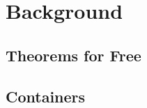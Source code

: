 
\section{Background}



\subsection{Theorems for Free}\label{sec:free}


\subsection{Containers}


\iffalse
- Deforestation (shortcut fusion)
- variations thereof
- cat-theory initial \& terminal
- library writer's guide
- church encodings
- free theorems
- further optimizations.
\fi


